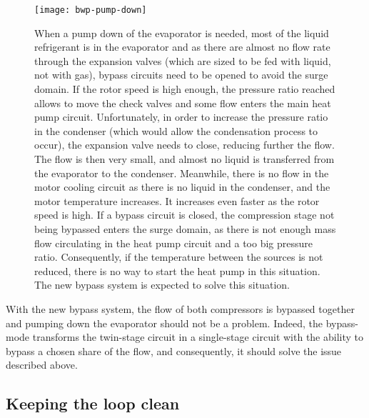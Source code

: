 \begin{figure}
  \centering
  \texttt{[image: bwp-pump-down]}
  \caption[Simplified layout in an evaporator pump down situation]
  {When a pump down of the evaporator is needed, most of the liquid
    refrigerant is in the evaporator and as there are almost no flow
    rate through the expansion valves (which are sized to be fed with
    liquid, not with gas), bypass circuits need to be opened to avoid
    the surge domain. If the rotor speed is high enough, the pressure
    ratio reached allows to move the check valves and some flow enters
    the main heat pump circuit. Unfortunately, in order to increase
    the pressure ratio in the condenser (which would allow the
    condensation process to occur), the expansion valve needs to
    close, reducing further the flow. The flow is then very small, and
    almost no liquid is transferred from the evaporator to the
    condenser. Meanwhile, there is no flow in the motor cooling
    circuit as there is no liquid in the condenser, and the motor
    temperature increases. It increases even faster as the rotor speed
    is high. If a bypass circuit is closed, the compression stage not
    being bypassed enters the surge domain, as there is not enough
    mass flow circulating in the heat pump circuit and a too big
    pressure ratio. Consequently, if the temperature between the
    sources is not reduced, there is no way to start the heat pump in
    this situation. The new bypass system is expected to solve this
    situation.}
  \label{fig:bwp-pumpdown-ev}
\end{figure}

With the new \BWP{} bypass system, the flow of both compressors is
bypassed together and pumping down the evaporator should not be a
problem. Indeed, the bypass-mode transforms the twin-stage circuit in
a single-stage circuit with the ability to bypass a chosen share of
the flow, and consequently, it should solve the issue described above.

\subsection{Keeping the loop clean}
\label{sec:awp-issue-oil+corrosion}

